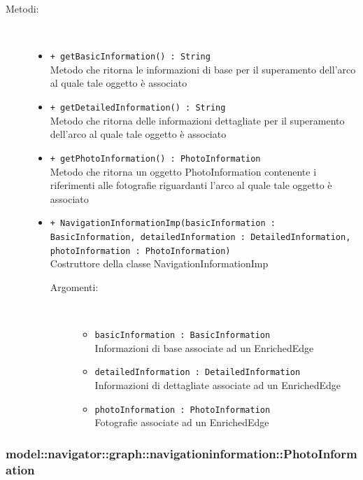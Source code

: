 \documentclass[../DefinizioneDiProdotto.tex]{subfiles}
\begin{document}
\begin{description}
\begin{itemize}
\end{itemize}
\item[Metodi:] \
\begin{itemize}
\item \texttt{+ getBasicInformation() : String}\\
Metodo che ritorna le informazioni di base per il superamento dell'arco al quale tale oggetto è associato
 \item \texttt{+ getDetailedInformation() : String}\\
Metodo che ritorna delle informazioni dettagliate per il superamento dell'arco al quale tale oggetto è associato
 \item \texttt{+ getPhotoInformation() : PhotoInformation}\\
Metodo che ritorna un oggetto PhotoInformation contenente i riferimenti alle fotografie riguardanti l'arco al quale tale oggetto è associato
 \item \texttt{+ NavigationInformationImp(basicInformation : BasicInformation, detailedInformation : DetailedInformation, photoInformation : PhotoInformation)}\\
Costruttore della classe NavigationInformationImp
 \begin{description}
\item[Argomenti:] \
\begin{itemize}
\item \texttt{basicInformation : BasicInformation}\\
Informazioni di base associate ad un EnrichedEdge\item \texttt{detailedInformation : DetailedInformation}\\
Informazioni di dettagliate associate ad un EnrichedEdge\item \texttt{photoInformation : PhotoInformation}\\
Fotografie associate ad un EnrichedEdge\end{itemize}
\end{description}
\end{itemize}
\end{description}

\subsubsection{model::navigator::graph::navigationinformation::PhotoInformation}
\end{document}
